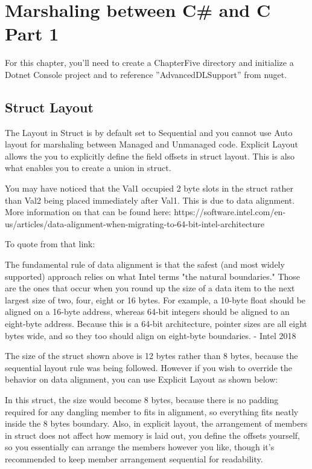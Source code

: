 \chapter{Marshaling between C\# and C Part 1}
For this chapter, you'll need to create a ChapterFive directory and initialize a Dotnet Console project and to reference ''AdvancedDLSupport'' from nuget.

\section{Struct Layout}
The Layout in Struct is by default set to Sequential and you cannot use Auto layout for marshaling between Managed and Unmanaged code. Explicit Layout allows the you to explicitly define the field offsets in struct layout. This is also what enables you to  create a union in struct.



You may have noticed that the Val1 occupied 2 byte slots in the struct rather than Val2 being placed immediately after Val1. This is due to data alignment.  More information on that can be found here: https://software.intel.com/en-us/articles/data-alignment-when-migrating-to-64-bit-intel-architecture

To quote from that link:

\begin{coloredbox}
	The fundamental rule of data alignment is that the safest (and most widely supported) approach relies on what Intel terms "the natural boundaries." Those are the ones that occur when you round up the size of a data item to the next largest size of two, four, eight or 16 bytes. For example, a 10-byte float should be aligned on a 16-byte address, whereas 64-bit integers should be aligned to an eight-byte address. Because this is a 64-bit architecture, pointer sizes are all eight bytes wide, and so they too should align on eight-byte boundaries. - Intel 2018
\end{coloredbox}

The size of the struct shown above is 12 bytes rather than 8 bytes, because the sequential layout rule was being followed. However if you wish to override the behavior on data alignment, you can use Explicit Layout as shown below:
\newpage


In this struct, the size would become 8 bytes, because there is no padding required for any dangling member to fits in alignment, so everything fits neatly inside the 8 bytes boundary. Also, in explicit layout, the arrangement of members in struct does not affect how memory is laid out, you define the offsets yourself, so you essentially can arrange the members however you like, though it's recommended to keep member arrangement sequential for readability.

